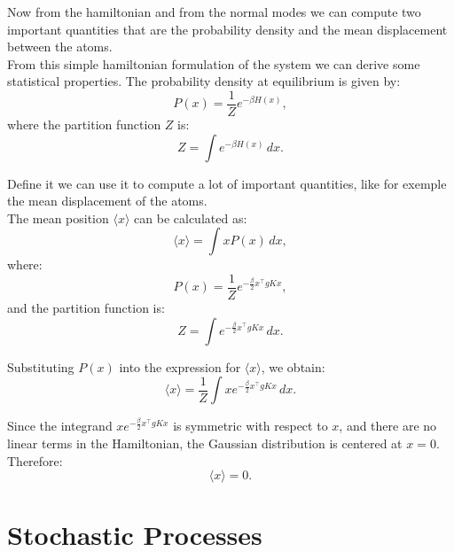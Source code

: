 \documentclass[English, Lau, oneside]{sapthesis}
\begin{document}
Now from the hamiltonian and from the normal modes we can compute two important quantities that are the probability density and the mean displacement between the atoms.\\
From this simple hamiltonian formulation of the system we can derive some statistical properties.
The probability density at equilibrium is given by:\cite{ref12}
\begin{equation}
    P({x}) = \frac{1}{Z} e^{-\beta H({x})},
\end{equation}
where the partition function \(Z\) is:
\begin{equation}
    Z = \int e^{-\beta H({x})} \, d{x}.
\end{equation}

Define it we can use it to compute a lot of important quantities, like for exemple the mean displacement of the atoms.\\
The mean position \(\langle {x} \rangle\) can be calculated as:\cite{ref12}
\begin{equation}
    \langle {x} \rangle = \int {x} P({x}) \, d{x},
\end{equation}
where:
\begin{equation}
    P({x}) = \frac{1}{Z} e^{-\frac{\beta}{2} {x}^\top {g}{K} {x}},
\end{equation}
and the partition function is:\cite{ref12}
\begin{equation}
    Z = \int e^{-\frac{\beta}{2} {x}^\top {g}{K} {x}} \, d{x}.
\end{equation}

Substituting \(P({x})\) into the expression for \(\langle {x} \rangle\), we obtain:
\begin{equation}
    \langle {x} \rangle = \frac{1}{Z} \int {x} e^{-\frac{\beta}{2} {x}^\top {g}{K} {x}} \, d{x}.
\end{equation}

Since the integrand \({x} e^{-\frac{\beta}{2} {x}^\top {g}{K} {x}}\) is symmetric with respect to \({x}\), and there are no linear terms in the Hamiltonian, the Gaussian distribution is centered at \({x} = 0\). Therefore:\cite{ref12}
\begin{equation}
    \langle {x} \rangle = 0.
\end{equation}

\newpage
\section{Stochastic Processes} \label{sec:stochastic_processes}
\end{document}

